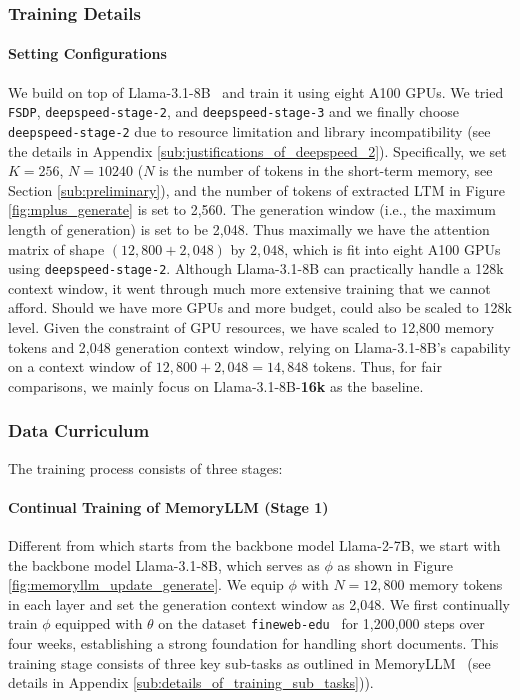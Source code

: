 \vspace{-5pt}
\subsubsection{Training Details}
\vspace{-5pt}
\paragraph{Setting Configurations} 
We build \ours on top of Llama-3.1-8B~\citep{llama3} and train it using eight A100 GPUs. 
We tried \texttt{FSDP}, \texttt{deepspeed-stage-2}, and \texttt{deepspeed-stage-3}
and we finally choose \texttt{deepspeed-stage-2}
due to resource limitation and library incompatibility (see the details in Appendix \ref{sub:justifications_of_deepspeed_2}). 
Specifically, we set $K=256$, $N=10240$ ($N$ is the number of tokens in the short-term memory, see Section \ref{sub:preliminary}), and the number of tokens of extracted LTM in Figure \ref{fig:mplus_generate} is set to 2,560. The generation window (i.e., the maximum length of generation) is set to be 2,048.
Thus maximally we have the attention matrix of shape $(12,800 + 2,048)$ by $2,048$, 
which is fit into eight A100 GPUs using \texttt{deepspeed-stage-2}. Although Llama-3.1-8B can practically handle a 128k context window, it went through much more extensive training that we cannot afford. Should we have more GPUs and more budget, \ours could also be scaled to 128k level. 
Given the constraint of GPU resources, we have scaled to 12,800 memory tokens and 2,048 generation context window, relying on Llama-3.1-8B's capability on a context window of $12,800+2,048=14,848$  tokens. Thus, for fair comparisons, we mainly focus on Llama-3.1-8B-\textbf{16k} as the baseline.

\vspace{-5pt}
\subsubsection{Data Curriculum}
\label{ssub:data_curriculum}
\vspace{-5pt}
The training process consists of three stages:

\vspace{-10pt}
\paragraph{Continual Training of MemoryLLM (Stage 1)}
Different from \cite{memoryllm} which starts from the backbone model Llama-2-7B, we start with the backbone model Llama-3.1-8B, which serves as $\phi$ as shown in Figure \ref{fig:memoryllm_update_generate}. We equip $\phi$ with $N=12,800$ memory tokens in each layer and set the generation context window as 2,048. We first continually train $\phi$ equipped with $\theta$ on the dataset \texttt{fineweb-edu}~\citep{fineweb} for 1,200,000 steps over four weeks, establishing a strong foundation for handling short documents. This training stage consists of three key sub-tasks as outlined in MemoryLLM~\citep{memoryllm} (see details in Appendix \ref{sub:details_of_training_sub_tasks})).


